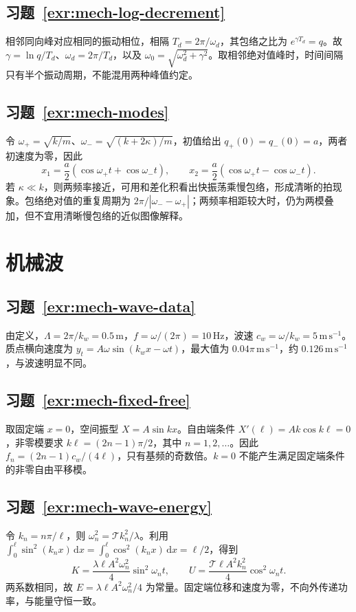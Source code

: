 \documentclass[UTF8,12pt,a4paper,fontset=fandol]{ctexbook}
\begin{document}
\subsection*{习题~\ref{exr:mech-log-decrement}}
相邻同向峰对应相同的振动相位，相隔 $T_d=2\pi/\omega_d$，其包络之比为 $e^{\gamma T_d}=q$。故 $\gamma=\ln q/T_d$、$\omega_d=2\pi/T_d$，以及 $\omega_0=\sqrt{\omega_d^2+\gamma^2}$。取相邻绝对值峰时，时间间隔只有半个振动周期，不能混用两种峰值约定。

\subsection*{习题~\ref{exr:mech-modes}}
令 $\omega_+=\sqrt{k/m}$、$\omega_-=\sqrt{(k+2\kappa)/m}$，初值给出 $q_+(0)=q_-(0)=a$，两者初速度为零，因此
\[
 x_1=\frac a2(\cos\omega_+t+\cos\omega_-t),\qquad
 x_2=\frac a2(\cos\omega_+t-\cos\omega_-t).
\]
若 $\kappa\ll k$，则两频率接近，可用和差化积看出快振荡乘慢包络，形成清晰的拍现象。包络绝对值的重复周期为 $2\pi/|\omega_--\omega_+|$；两频率相距较大时，仍为两模叠加，但不宜用清晰慢包络的近似图像解释。

\section{机械波}
\subsection*{习题~\ref{exr:mech-wave-data}}
由定义，$\Lambda=2\pi/k_w=0.5\,\mathrm m$，$f=\omega/(2\pi)=10\,\mathrm{Hz}$，波速 $c_w=\omega/k_w=5\,\mathrm{m\,s^{-1}}$。质点横向速度为 $y_t=A\omega\sin(k_wx-\omega t)$，最大值为 $0.04\pi\,\mathrm{m\,s^{-1}}$，约 $0.126\,\mathrm{m\,s^{-1}}$，与波速明显不同。

\subsection*{习题~\ref{exr:mech-fixed-free}}
取固定端 $x=0$，空间振型 $X=A\sin kx$。自由端条件 $X'(\ell)=Ak\cos k\ell=0$，非零模要求 $k\ell=(2n-1)\pi/2$，其中 $n=1,2,\ldots$。因此 $f_n=(2n-1)c_w/(4\ell)$，只有基频的奇数倍。$k=0$ 不能产生满足固定端条件的非零自由平移模。

\subsection*{习题~\ref{exr:mech-wave-energy}}
令 $k_n=n\pi/\ell$，则 $\omega_n^2=\mathcal T k_n^2/\lambda$。利用 $\int_0^\ell\sin^2(k_nx)\,\mathrm dx=\int_0^\ell\cos^2(k_nx)\,\mathrm dx=\ell/2$，得到
\[
 K=\frac{\lambda\ell A^2\omega_n^2}{4}\sin^2\omega_nt,\qquad
 U=\frac{\mathcal T\ell A^2k_n^2}{4}\cos^2\omega_nt.
\]
两系数相同，故 $E=\lambda\ell A^2\omega_n^2/4$ 为常量。固定端位移和速度为零，不向外传递功率，与能量守恒一致。
\end{document}
